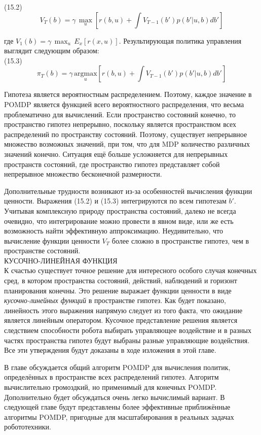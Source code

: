 \documentclass[10pt,a4paper]{article}
\begin{document}
(15.2)
$$V_T(b)=\gamma\,\underset{u}{\max}[r(b,u)+\int V_{T-1}(b')p(b'|u,b)db']$$

где $V_1(b) = \gamma \,\max_u\,E_x[r(x,u)]$. Результирующая политика управления выглядит следующим образом:\\

(15.3)
$$\pi_T(b)=\gamma\,\underset{u}{\text{argmax}}[r(b,u)+\int V_{T-1}(b')p(b'|u,b)db']$$

Гипотеза является вероятностным распределением. Поэтому, каждое значение в POMDP является функцией всего вероятностного распределения, что весьма проблематично для вычислений. Если пространство состояний конечно, то пространство гипотез непрерывно, поскольку является пространством всех распределений по пространству состояний. Поэтому, существует непрерывное множество возможных значений, при том, что для MDP количество различных значений конечно. Ситуация ещё больше усложняется для непрерывных пространств состояний, где пространство гипотез представляет собой непрерывное множество бесконечной размерности.

Дополнительные трудности возникают из-за особенностей вычисления функции ценности. Выражения (15.2) и (15.3) интегрируются по всем гипотезам $b'$. Учитывая комплексную природу пространства состояний, далеко не всегда очевидно, что интегрирование можно провести в явном виде, или же есть возможность найти эффективную аппроксимацию. Неудивительно, что вычисление функции ценности $V_T$ более сложно в пространстве гипотез, чем в пространстве состояний.\\

КУСОЧНО-ЛИНЕЙНАЯ ФУНКЦИЯ\\

К счастью существует точное решение для интересного особого случая конечных сред, в котором пространства состояний, действий, наблюдений и горизонт планирования конечны. Это решение выражает функции ценности в виде \textit{кусочно-линейных функций} в пространстве гипотез. Как будет показано, линейность этого выражения напрямую следует из того факта, что ожидание является линейным оператором. Кусочное представление решения является следствием способности робота выбирать управляющее воздействие и в разных частях пространства гипотез будут выбраны разные управляющие воздействия. Все эти утверждения будут доказаны в ходе изложения в этой главе.

В главе обсуждается общий алгоритм POMDP для вычисления политик, определённых в пространстве всех распределений гипотез. Алгоритм вычислительно громоздкий, но применимый для конечных POMDP. Дополнительно будет обсуждаться очень легко вычислимый вариант. В следующей главе будут представлены более эффективные приближённые алгоритмы POMDP, пригодные для масштабирования в реальных задачах робототехники.
\end{document}
